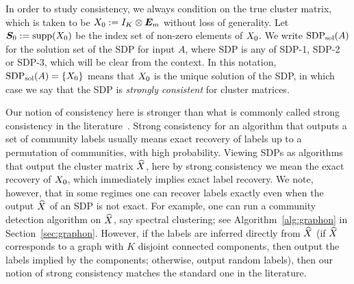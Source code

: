 In order to study consistency, we always condition on the true cluster matrix, which is taken to be $X_0 := I_K \otimes \bm{E}_m$ without loss of generality.  Let $\bm{S}_0 := \operatorname{supp}(X_0)$ be the index set of non-zero elements of $X_0$.   We write $\operatorname{SDP_{sol}}(A)$ for the solution set of the SDP for input $A$, where 
SDP is any of SDP-1, SDP-2 or SDP-3, which will be clear from the context.   In this notation, $\operatorname{SDP_{sol}}(A) = \{X_0\}$ means that $X_0$ is the unique solution of the SDP, in which case we say that the SDP is \emph{strongly consistent} for cluster matrices. 
\begin{rem}
Our notion of consistency here is stronger than what is commonly called strong consistency in the literature~\cite{Zhaoetal2012, Bickel2009, Amini.et.al.2013, Mossel2014}.   Strong consistency for an algorithm that outputs a set of community labels usually means exact recovery of labels up to a permutation of communities, with high probability.  Viewing SDPs as algorithms that output the cluster matrix $\widehat{X}$, here by strong consistency we mean the exact recovery of $X_0$, which immediately implies exact label recovery. We note, however, that in some regimes one can recover labels exactly even when the output $\widehat{X}$ of an SDP is not exact. For example, one can run a community detection algorithm on $\widehat{X}$, say spectral clustering;  see Algorithm~\ref{alg:graphon} in Section~\ref{sec:graphon}.   However, if the labels are inferred directly from $\widehat{X}$  (if $\widehat{X}$ corresponds to a graph with $K$ disjoint connected components, then output the labels implied by the components; otherwise, output random labels), then our notion of strong consistency matches the standard one in the literature.   
\end{rem}


